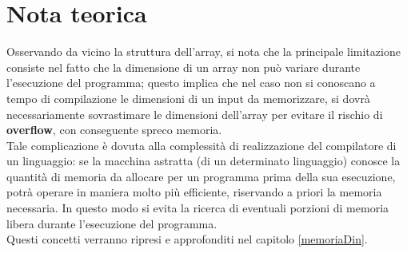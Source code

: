 \section{Nota teorica}
Osservando da vicino la struttura dell'array, si nota che la principale limitazione consiste nel fatto che la dimensione di un array non può variare durante l'esecuzione del programma; questo implica che nel caso non si conoscano a tempo di compilazione le dimensioni di un input da memorizzare, si dovrà necessariamente sovrastimare le dimensioni dell'array per evitare il rischio di \textbf{overflow}, con conseguente spreco memoria.\\ 
Tale complicazione è dovuta alla complessità di realizzazione del compilatore di un linguaggio: se la macchina astratta (di un determinato linguaggio) conosce la quantità di memoria da allocare per un programma prima della sua esecuzione, 
potrà operare in maniera molto più efficiente, riservando a priori la memoria necessaria. In questo modo si evita la ricerca di  eventuali porzioni di memoria libera durante l'esecuzione del programma.\\
Questi concetti verranno ripresi e approfonditi nel capitolo \ref{memoriaDin}.